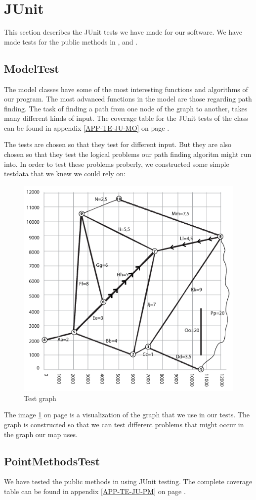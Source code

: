 \section{JUnit}
\label{TEST-JU}
This section describes the JUnit tests we have made for our software. We have
made tests for the public methods in ,  and
.
\subsection{ModelTest}
\label{TEST-JU-MT}
The model classes have some of the most interesting functions and algorithms of
our program. The most advanced functions in the model are those regarding path
finding. The task of finding a path from one node of the graph to another,
takes many different kinds of input. The coverage table for the JUnit tests of
the  class can be found in appendix \ref{APP-TE-JU-MO} on page
\pageref{APP-TE-JU-MO}.

The tests are chosen so that they test for different input. But they are also
chosen so that they test the logical problems our path finding algoritm might
run into. In order to test these problems proberly, we constructed some simple
testdata that we knew we could rely on:
\begin{figure}[!ht]
\centering
\includegraphics[width=0.6\linewidth]{images/TestGraph}
\caption{Test graph}
\label{TEST-JU-MT-TG}
\end{figure}

The image \ref{TEST-JU-MT-TG} on page \pageref{TEST-JU-MT-TG} is a visualization
of the graph that we use in our tests. The graph is constructed so that we can
test different problems that might occur in the graph our map uses.

\subsection{PointMethodsTest}
\label{TEST-JU-PMT}
We have tested the public methods in  using JUnit testing.
The complete coverage table can be found in appendix \ref{APP-TE-JU-PM} on page
\pageref{APP-TE-JU-PM}.

